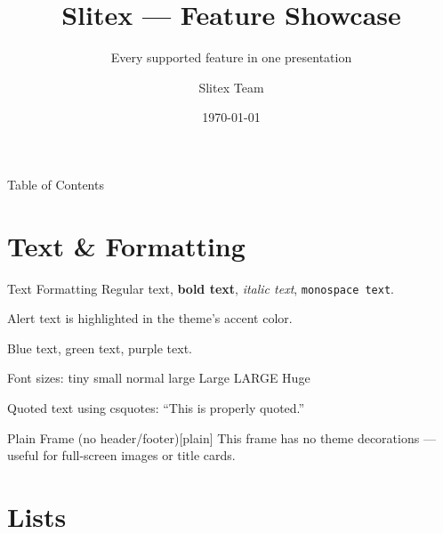 \documentclass[aspectratio=169]{beamer}
\title[Slitex Showcase]{Slitex — Feature Showcase}
\subtitle{Every supported feature in one presentation}
\author[Slitex]{Slitex Team}
\institute[GitHub]{github.com/omurilo/slitex}
\date[\today]{\today}
\begin{document}

\begin{frame}
  \titlepage
\end{frame}


\begin{frame}{Table of Contents}
  \tableofcontents
\end{frame}

\section{Text \& Formatting}

\begin{frame}{Text Formatting}
  Regular text, \textbf{bold text}, \textit{italic text}, \texttt{monospace text}.

  \alert{Alert text} is highlighted in the theme's accent color.

  \textcolor{primary}{Blue text}, \textcolor{success}{green text}, \textcolor{secondary}{purple text}.

  \medskip

  Font sizes: {\tiny tiny} {\small small} normal {\large large} {\Large Large} {\LARGE LARGE} {\Huge Huge}

  \medskip

  Quoted text using csquotes: \enquote{This is properly quoted.}
\end{frame}

\begin{frame}{Plain Frame (no header/footer)}[plain]
  This frame has no theme decorations — useful for full-screen images or title cards.
\end{frame}

\section{Lists}
\end{document}
